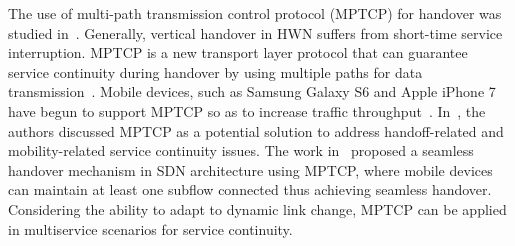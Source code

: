 \documentclass[conference]{IEEEtran}
\begin{document}

The use of multi-path transmission control protocol (MPTCP) for handover was studied in~\cite{acmmptcp, phone,MPTCP, Tsinghua}. 
Generally, vertical handover in HWN suffers from short-time service interruption.
MPTCP is a new transport layer protocol that can guarantee service continuity during handover by using multiple paths for data transmission~\cite{acmmptcp}.
Mobile devices, such as Samsung Galaxy S6 and Apple iPhone 7 have begun to support MPTCP so as to increase traffic throughput~\cite{phone}. 
In~\cite{MPTCP}, the authors discussed MPTCP as a potential solution to address handoff-related and mobility-related service continuity issues.
The work in~\cite{Tsinghua} proposed a seamless handover mechanism in SDN architecture using MPTCP, where mobile devices can maintain at least one subflow connected thus achieving seamless handover. 
Considering the ability to adapt to dynamic link change, MPTCP can be applied in multiservice scenarios for service continuity. 

\end{document}
